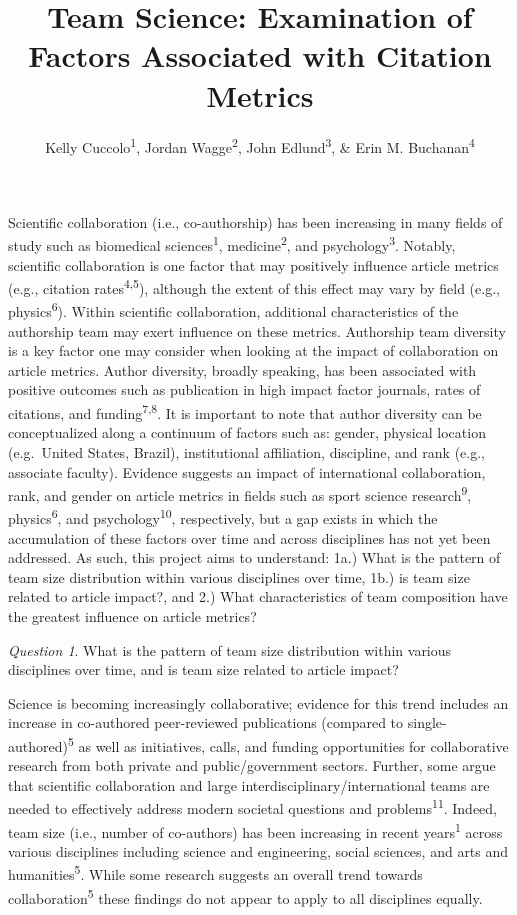 \documentclass[
  man,floatsintext]{apa6}
\title{Team Science: Examination of Factors Associated with Citation Metrics}
\author{Kelly Cuccolo\textsuperscript{1}, Jordan Wagge\textsuperscript{2}, John Edlund\textsuperscript{3}, \& Erin M. Buchanan\textsuperscript{4}}
\date{}
\affiliation{\vspace{0.5cm}\textsuperscript{1} Michigan Virtual\\\textsuperscript{2} Avila University\\\textsuperscript{3} Rochester Institute of Technology\\\textsuperscript{4} Harrisburg University of Science and Technology}
\begin{document}
\maketitle

Scientific collaboration (i.e., co-authorship) has been increasing in many fields of study such as biomedical sciences\textsuperscript{1}, medicine\textsuperscript{2}, and psychology\textsuperscript{3}. Notably, scientific collaboration is one factor that may positively influence article metrics (e.g., citation rates\textsuperscript{4,5}), although the extent of this effect may vary by field (e.g., physics\textsuperscript{6}). Within scientific collaboration, additional characteristics of the authorship team may exert influence on these metrics. Authorship team diversity is a key factor one may consider when looking at the impact of collaboration on article metrics. Author diversity, broadly speaking, has been associated with positive outcomes such as publication in high impact factor journals, rates of citations, and funding\textsuperscript{7,8}. It is important to note that author diversity can be conceptualized along a continuum of factors such as: gender, physical location (e.g.~United States, Brazil), institutional affiliation, discipline, and rank (e.g., associate faculty). Evidence suggests an impact of international collaboration, rank, and gender on article metrics in fields such as sport science research\textsuperscript{9}, physics\textsuperscript{6}, and psychology\textsuperscript{10}, respectively, but a gap exists in which the accumulation of these factors over time and across disciplines has not yet been addressed. As such, this project aims to understand: 1a.) What is the pattern of team size distribution within various disciplines over time, 1b.) is team size related to article impact?, and 2.) What characteristics of team composition have the greatest influence on article metrics?

\emph{Question 1}. What is the pattern of team size distribution within various disciplines over time, and is team size related to article impact?

Science is becoming increasingly collaborative; evidence for this trend includes an increase in co-authored peer-reviewed publications (compared to single-authored)\textsuperscript{5} as well as initiatives, calls, and funding opportunities for collaborative research from both private and public/government sectors. Further, some argue that scientific collaboration and large interdisciplinary/international teams are needed to effectively address modern societal questions and problems\textsuperscript{11}. Indeed, team size (i.e., number of co-authors) has been increasing in recent years\textsuperscript{1} across various disciplines including science and engineering, social sciences, and arts and humanities\textsuperscript{5}. While some research suggests an overall trend towards collaboration\textsuperscript{5} these findings do not appear to apply to all disciplines equally.
\end{document}
